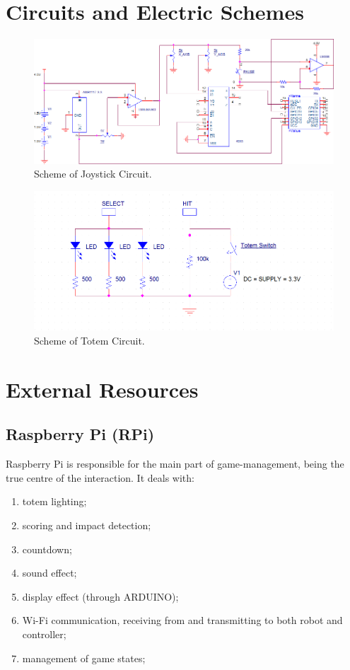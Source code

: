 \documentclass[a4paper,twoside]{book}
\begin{document}
\begin{appendices}

\chapter{Circuits and Electric Schemes}
\label{app:circuit}

\begin{figure}[h]
\includegraphics[width=\linewidth]{img/ControllerCircuitry} 
\caption{Scheme of Joystick Circuit.}
\end{figure}

\begin{figure}[h]
\includegraphics[width=\linewidth]{img/Totem} 
\caption{Scheme of Totem Circuit.}
\end{figure}

\chapter{External Resources}
\label{app:external}

\section{Raspberry Pi (RPi)}
\label{app:RPi}
Raspberry Pi is responsible for the main part of game-management, being the true centre of the interaction. It deals with:
\begin{enumerate}
\item totem lighting;
\item scoring and impact detection;
\item countdown;
\item sound effect;
\item display effect (through ARDUINO);
\item Wi-Fi communication, receiving from and transmitting to both robot and controller;
\item management of game states;
\end {enumerate}


\end{appendices}
\end{document}
